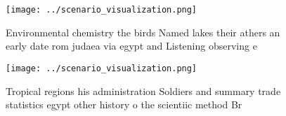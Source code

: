 \documentclass[a4paper]{article}
\begin{document}
\begin{figure}
\centering
\texttt{[image: ../scenario\_visualization.png]}
\caption{Environmental chemistry the birds Named lakes their athers an early date rom judaea via egypt and Listening observing e
}
\end{figure}
 
\begin{figure}
\centering
\texttt{[image: ../scenario\_visualization.png]}
\caption{Tropical regions his administration Soldiers and summary trade statistics egypt other history o the scientiic method Br
}
\end{figure}
 
\end{document}
